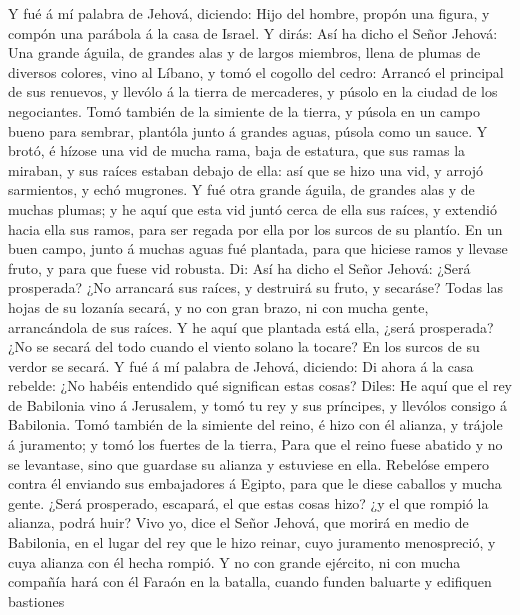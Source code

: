  Y fué á mí palabra de Jehová, diciendo: 
Hijo del hombre, propón una figura, y compón una parábola á la casa de
Israel.  Y dirás: Así ha dicho el Señor Jehová: Una grande
águila, de grandes alas y de largos miembros, llena de plumas de
diversos colores, vino al Líbano, y tomó el cogollo del cedro:
 Arrancó el principal de sus renuevos, y llevólo á la
tierra de mercaderes, y púsolo en la ciudad de los negociantes.
 Tomó también de la simiente de la tierra, y púsola en un
campo bueno para sembrar, plantóla junto á grandes aguas, púsola como un
sauce.  Y brotó, é hízose una vid de mucha rama, baja de
estatura, que sus ramas la miraban, y sus raíces estaban debajo de ella:
así que se hizo una vid, y arrojó sarmientos, y echó mugrones.
 Y fué otra grande águila, de grandes alas y de muchas
plumas; y he aquí que esta vid juntó cerca de ella sus raíces, y
extendió hacia ella sus ramos, para ser regada por ella por los surcos
de su plantío.  En un buen campo, junto á muchas aguas fué
plantada, para que hiciese ramos y llevase fruto, y para que fuese vid
robusta.  Di: Así ha dicho el Señor Jehová: ¿Será
prosperada? ¿No arrancará sus raíces, y destruirá su fruto, y secaráse?
Todas las hojas de su lozanía secará, y no con gran brazo, ni con mucha
gente, arrancándola de sus raíces.  Y he aquí que
plantada está ella, ¿será prosperada? ¿No se secará del todo cuando el
viento solano la tocare? En los surcos de su verdor se secará.
 Y fué á mí palabra de Jehová, diciendo: 
Di ahora á la casa rebelde: ¿No habéis entendido qué significan estas
cosas? Diles: He aquí que el rey de Babilonia vino á Jerusalem, y tomó
tu rey y sus príncipes, y llevólos consigo á Babilonia. 
Tomó también de la simiente del reino, é hizo con él alianza, y trájole
á juramento; y tomó los fuertes de la tierra,  Para que
el reino fuese abatido y no se levantase, sino que guardase su alianza y
estuviese en ella.  Rebelóse empero contra él enviando
sus embajadores á Egipto, para que le diese caballos y mucha gente.
¿Será prosperado, escapará, el que estas cosas hizo? ¿y el que rompió la
alianza, podrá huir?  Vivo yo, dice el Señor Jehová, que
morirá en medio de Babilonia, en el lugar del rey que le hizo reinar,
cuyo juramento menospreció, y cuya alianza con él hecha rompió.
 Y no con grande ejército, ni con mucha compañía hará con
él Faraón en la batalla, cuando funden baluarte y edifiquen bastiones
